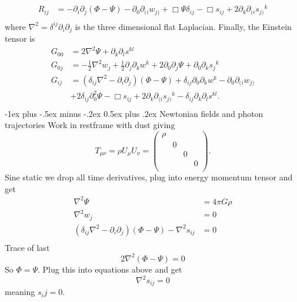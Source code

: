 \documentclass[10pt,landscape,a4paper]{article}
\makeatletter
\newcommand{\munu} {\mu\nu}
\renewcommand{\section}{\@startsection{section}{1}{0mm}%
                                {-1ex plus -.5ex minus -.2ex}%
                                {0.5ex plus .2ex}%
                                {\normalfont\large\bfseries}}
\makeatother
\begin{document}
\begin{multicols}{3}
\begin{equation}
\begin{split}
R_{ij} &= -\partial_i\partial_j(\Phi-\Psi)-\partial_0\partial_{(i}w_{j)} +\Box\Psi\delta_{ij} -\Box s_{ij} +2\partial_k\partial_{(i}s_{j)}{}^k \\
\end{split}
\end{equation}
where $\nabla^2 = \delta^{ij}\partial_i\partial_j$ is the three dimensional flat Laplacian.
Finally, the Einstein tensor is
\begin{equation}
\begin{split}
G_{00} &= 2\nabla^2\Psi +\partial_k\partial_l s^{kl}   \\
G_{0j} &= -\frac{1}{2}\nabla^2w_j +\frac{1}{2}\partial_j\partial_kw^k + 2\partial_0\partial_j\Psi+\partial_0\partial_ks_j{}^k   \\
G_{ij} &=  (\delta_{ij}\nabla^2 -\partial_i\partial_j)(\Phi-\Psi) +\delta_{ij}\partial_0\partial_kw^k-\partial_0\partial_{(i}w_{j)}  \\
&+2\delta_{ij}\partial_0^2\Psi -\Box s_{ij} +2\partial_k\partial_{(i}s_{j)}{}^k-\delta_{ij}\partial_k\partial_ls^{kl}.\\
\end{split}
\end{equation}
\section{Newtonian fields and photon trajectories}
Work in restframe with dust giving
\begin{equation}
T_{\munu} = \rho U_\mu U_\nu = \begin{pmatrix}
\rho &&&\\
&0&&\\
&&0&\\
&&&0\\
\end{pmatrix}.
\end{equation}
Sine static we drop all time derivatives, plug into energy momentum tensor and get
\begin{equation}
\begin{split}
\nabla^2\Psi  &=4\pi G\rho\\
\nabla^2w_j &= 0\\
(\delta_{ij}\nabla^2 -\partial_i\partial_j)(\Phi -\Psi) -\nabla^2 s_{ij} &= 0\\
\end{split}
\end{equation}
Trace of last
\begin{equation}
2\nabla^2(\Phi-\Psi) = 0
\end{equation}
So $\Phi=\Psi$. Plug this into equations above and get
\begin{equation}
\nabla^2 s_{ij} = 0
\end{equation}
meaning $s_ij = 0$.


\end{multicols}
\end{document}
